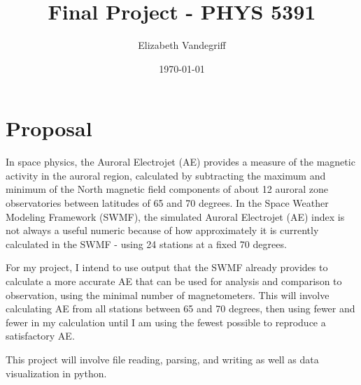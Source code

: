 \documentclass[12pt, letterpaper]{article}
\begin{document}
\title{Final Project - PHYS 5391}
\author{Elizabeth Vandegriff}
\date{\today}

\maketitle
\newpage


\section{Proposal}
In space physics, the Auroral Electrojet (AE) provides a measure of the magnetic activity in the auroral region, calculated by subtracting the maximum and minimum of the North magnetic field components of about 12 auroral zone observatories between latitudes of 65 and 70 degrees. In the Space Weather Modeling Framework (SWMF), the simulated Auroral Electrojet (AE) index is not always a useful numeric because of how approximately it is currently calculated in the SWMF - using 24 stations at a fixed 70 degrees.

For my project, I intend to use output that the SWMF already provides to calculate a more accurate AE that can be used for analysis and comparison to observation, using the minimal number of magnetometers. This will involve calculating AE from all stations between 65 and 70  degrees, then using fewer and fewer in my calculation until I am using the fewest possible to reproduce a satisfactory AE.

This project will involve file reading, parsing, and writing as well as data visualization in python.

\end{document}
